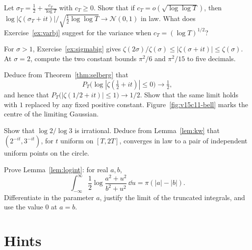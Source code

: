 \begin{exercise}[$\star$]\label{ex:fixedW}
Let $\sigma_T=\frac12+\frac{c_T}{\log T}$ with $c_T\ge0$. Show that if $c_T=o(\sqrt{\log\log T})$, then $\log|\zeta(\sigma_T+it)|/\sqrt{\frac12\log\log T}\to\mathcal N(0,1)$ in law. What does Exercise~\ref{ex:varbj} suggest for the variance when $c_T=(\log T)^{1/2}$?
\end{exercise}

\begin{exercise}[$\star$]\label{ex:v15-11-1}
For \(\sigma>1\), Exercise~\ref{ex:sigmabig} gives \(\zeta(2\sigma)/\zeta(\sigma)\le|\zeta(\sigma+it)|\le\zeta(\sigma)\). At \(\sigma=2\), compute the two constant bounds \(\pi^2/6\) and \(\pi^2/15\) to five decimals.
\end{exercise}

\begin{exercise}[$\star$]\label{ex:v15-11-2}
Deduce from Theorem~\ref{thm:selberg} that
\[
P_T\bigl(\log|\zeta(\tfrac12+it)|\le0\bigr)\to\tfrac12,
\]
and hence that \(P_T\bigl(|\zeta(1/2+it)|\le1\bigr)\to1/2\). Show that the same limit holds with \(1\) replaced by any fixed positive constant. Figure~\ref{fig:v15c11-bell} marks the centre of the limiting Gaussian.
\end{exercise}

\begin{exercise}[$\star\star$]\label{ex:v15-11-3}
Show that \(\log2/\log3\) is irrational. Deduce from Lemma~\ref{lem:kw} that \((2^{-it},3^{-it})\), for \(t\) uniform on \([T,2T]\), converges in law to a pair of independent uniform points on the circle.
\end{exercise}

\begin{exercise}[$\star\star\star$]\label{ex:v15-11-4}
Prove Lemma~\ref{lem:logint}: for real \(a,b\),
\[
\int_{-\infty}^{\infty}\frac12\log\frac{a^2+u^2}{b^2+u^2}\,\dd u=\pi(|a|-|b|).
\]
Differentiate in the parameter \(a\), justify the limit of the truncated integrals, and use the value \(0\) at \(a=b\).
\end{exercise}

\section{Hints}

